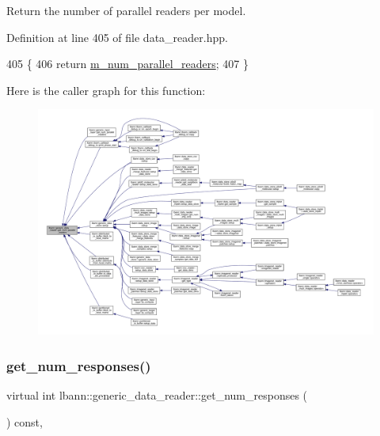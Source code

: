 Return the number of parallel readers per model. 



Definition at line 405 of file data\+\_\+reader.\+hpp.


\begin{DoxyCode}
405                                        \{
406     \textcolor{keywordflow}{return} \hyperlink{classlbann_1_1generic__data__reader_a6eb9b8c7c704374a1e49dce87110455e}{m\_num\_parallel\_readers};
407   \}
\end{DoxyCode}
Here is the caller graph for this function\+:\nopagebreak
\begin{figure}[H]
\begin{center}
\leavevmode
\includegraphics[width=350pt]{classlbann_1_1generic__data__reader_ad15887cc31657d03925835aab0d4b675_icgraph}
\end{center}
\end{figure}
\mbox{\label{classlbann_1_1generic__data__reader_a054be9375a6e8338c893230f83c1497f}} 
\subsubsection{\texorpdfstring{get\+\_\+num\+\_\+responses()}{get\_num\_responses()}}
{\footnotesize\ttfamily virtual int lbann\+::generic\+\_\+data\+\_\+reader\+::get\+\_\+num\+\_\+responses (\begin{DoxyParamCaption}{ }\end{DoxyParamCaption}) const\hspace{0.3cm}{\ttfamily [inline]}, {\ttfamily [virtual]}}



